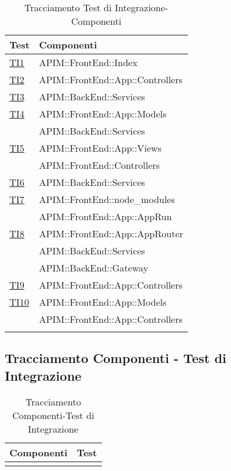 \normalsize
\begin{longtable}{|>{\centering}m{5cm}|m{7cm}<{\centering}|}
	\hline \rowcolor{Gray}
	\textbf{Test} & \textbf{Componenti}\\
	\hline
	\endhead
	\hyperlink{TI1}{TI1} & APIM::FrontEnd::Index \\ \hline
	\hyperlink{TI2}{TI2} & APIM::FrontEnd::App::Controllers \\ \hline
	\hyperlink{TI3}{TI3} & APIM::BackEnd::Services \\ \hline
	\hyperlink{TI4}{TI4} & APIM::FrontEnd::App::Models\\&APIM::BackEnd::Services \\ \hline
	\hyperlink{TI5}{TI5} & APIM::FrontEnd::App::Views\\&APIM::FrontEnd::Controllers \\ \hline
	\hyperlink{TI6}{TI6} & APIM::BackEnd::Services \\ \hline
	\hyperlink{TI7}{TI7} & APIM::FrontEnd::node\_modules\\&APIM::FrontEnd::App::AppRun \\ \hline
	\hyperlink{TI8}{TI8} & APIM::FrontEnd::App::AppRouter\\&APIM::BackEnd::Services\\&APIM::BackEnd::Gateway \\ \hline
	\hyperlink{TI9}{TI9} & APIM::FrontEnd::App::Controllers \\ \hline
	\hyperlink{TI10}{TI10} & APIM::FrontEnd::App::Models\\&APIM::FrontEnd::App::Controllers \\ \hline
	
	\caption[Tracciamento Test di Integrazione-Componenti]{Tracciamento Test di Integrazione-Componenti}
	\label{tabella:ti-componenti}
\end{longtable}
\clearpage

\subsection{Tracciamento Componenti - Test di Integrazione}

\normalsize
\begin{longtable}{|>{\centering}m{5cm}|m{5cm}<{\centering}|}
	\hline \rowcolor{Gray}
	\textbf{Componenti} & \textbf{Test}\\
	\hline
	\endhead
	
	\caption[Tracciamento Componenti-Test di Integrazione]{Tracciamento Componenti-Test di Integrazione}
	\label{tabella:componenti-ti}
\end{longtable}
\clearpage

